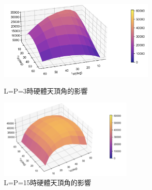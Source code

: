 \begin{figure}[htpb]
    \centering
    \begin{minipage}{.5\textwidth}
        \centering
        \includegraphics[height=4cm]{ch4pic/num3 alpha surface.png}
        \caption{L=P=3時硬體天頂角的影響}
        \label{pic:num3 alpha surface}
    \end{minipage}%
    \begin{minipage}{0.5\textwidth}
        \centering
        \includegraphics[height=4cm]{ch4pic/num15 alpha surface.png}
        \caption{L=P=15時硬體天頂角的影響}
        \label{pic:num15 alpha surface}
    \end{minipage}
\end{figure}














